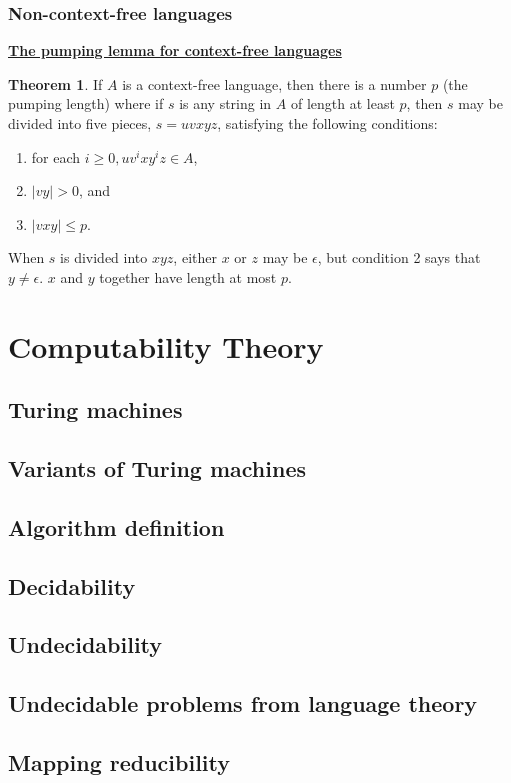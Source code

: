 \documentclass[11pt]{article}
\theoremstyle{definition}
\newtheorem{thm}{Theorem}[section]
\begin{document}
\subsubsection{Non-context-free languages}
\textbf{\underline{The pumping lemma for context-free languages}}
\begin{thm}
    If $A$ is a context-free language, then there is a number $p$ (the pumping length) where if $s$ is any string in $A$ of length at least $p$, then $s$ may be divided into five pieces, $s = uvxyz$, satisfying the following conditions:
    \begin{enumerate}
        \item for each $i\geq 0, uv^ixy^iz\in A$,
        \item $|vy|>0$, and
        \item $|vxy| \leq p$.
    \end{enumerate}
When $s$ is divided into $xyz$, either $x$ or $z$ may be $\epsilon$, but condition 2 says that $y \neq \epsilon$. $x$ and $y$ together have length at most $p$.
\end{thm}
\pagebreak
\section{Computability Theory}
\subsection{Turing machines}

\subsection{Variants of Turing machines}
\subsection{Algorithm definition}
\subsection{Decidability}
\subsection{Undecidability}
\subsection{Undecidable problems from language theory}
\subsection{Mapping reducibility}
\end{document}
